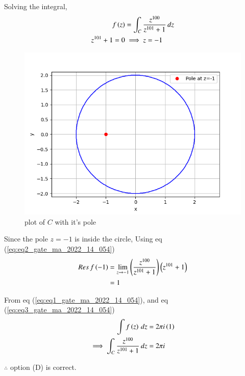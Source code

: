 \documentclass[journal,12pt,twocolumn]{IEEEtran}
\begin{document}
Solving the integral,
\begin{align}
f\left(z\right) &= \int_C \frac{z^{100}}{z^{101}+1}\, dz\\
z^{101} + 1 = 0 &\implies z = -1
\end{align}

\begin{figure}[ht]
    \centering
    \includegraphics[width=\columnwidth]{figs/Figure_1.png}
    \caption{plot of $C$ with it's pole}
    \label{fig:fig1_gate_ma_2022_14_054}
\end{figure}
Since the pole $z=-1$ is inside the circle, Using eq (\ref{eq:eq2_gate_ma_2022_14_054})
\begin{align}
    Res\, f\left(-1\right) &= \lim_{z\to -1}\left(\frac{z^{100}}{z^{101}+1}\right)\left(z^{101} + 1\right)\\
    &= 1 \label{eq:eq3_gate_ma_2022_14_054}
\end{align}

From eq (\ref{eq:eq1_gate_ma_2022_14_054}), and eq (\ref{eq:eq3_gate_ma_2022_14_054})
\begin{align}
    \int f\left(z\right)\, dz &= 2\pi i \left(1\right)\\
    \implies \int_C \frac{z^{100}}{z^{101}+1}\, dz &= 2 \pi i
\end{align}

$\therefore$ option (D) is correct.
\end{document}
